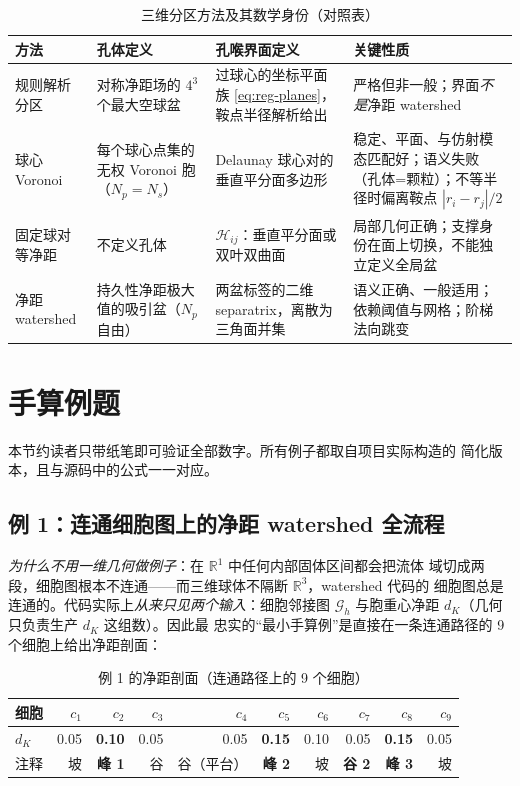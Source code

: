 \documentclass[UTF8,zihao=-4]{ctexart}
\newcommand{\R}{\mathbb{R}}
\begin{document}
\begin{table}[htbp]
\centering
\caption{三维分区方法及其数学身份（对照表）}
\label{tab:partition-identity}
\small
\begin{tabularx}{\textwidth}{p{2.9cm}p{3.2cm}p{3.6cm}X}
\toprule
方法 & 孔体定义 & 孔喉界面定义 & 关键性质\\
\midrule
规则解析分区
& 对称净距场的 $4^3$ 个最大空球盆
& 过球心的坐标平面族 \eqref{eq:reg-planes}，鞍点半径解析给出
& 严格但非一般；界面\emph{不是}净距 watershed\\
球心 Voronoi
& 每个球心点集的无权 Voronoi 胞（$N_p=N_s$）
& Delaunay 球心对的垂直平分面多边形
& 稳定、平面、与仿射模态匹配好；语义失败（孔体=颗粒）；不等半径时偏离鞍点 $|r_i-r_j|/2$\\
固定球对等净距
& 不定义孔体
& $\mathcal H_{ij}$：垂直平分面或双叶双曲面
& 局部几何正确；支撑身份在面上切换，不能独立定义全局盆\\
净距 watershed
& 持久性净距极大值的吸引盆（$N_p$ 自由）
& 两盆标签的二维 separatrix，离散为三角面并集
& 语义正确、一般适用；依赖阈值与网格；阶梯法向跳变\\
\bottomrule
\end{tabularx}
\end{table}

\section{手算例题}

本节约读者只带纸笔即可验证全部数字。所有例子都取自项目实际构造的
简化版本，且与源码中的公式一一对应。

\subsection{例 1：连通细胞图上的净距 watershed 全流程}

\emph{为什么不用一维几何做例子}：在 $\R^1$ 中任何内部固体区间都会把流体
域切成两段，细胞图根本不连通——而三维球体不隔断 $\R^3$，watershed 代码的
细胞图总是连通的。代码实际上\emph{从来只见两个输入}：细胞邻接图
$\mathcal G_h$ 与胞重心净距 $d_K$（几何只负责生产 $d_K$ 这组数）。因此最
忠实的``最小手算例''是直接在一条连通路径的 9 个细胞上给出净距剖面：

\begin{table}[htbp]
\centering
\caption{例 1 的净距剖面（连通路径上的 9 个细胞）}
\label{tab:ex1-profile}
\small
\begin{tabular}{lrrrrrrrrr}
\toprule
细胞 & $c_1$ & $c_2$ & $c_3$ & $c_4$ & $c_5$ & $c_6$ & $c_7$ & $c_8$ & $c_9$\\
\midrule
$d_K$ & 0.05 & \textbf{0.10} & 0.05 & 0.05 & \textbf{0.15} & 0.10 & 0.05 & \textbf{0.15} & 0.05\\
注释 & 坡 & \textbf{峰 1} & 谷 & 谷（平台） & \textbf{峰 2} & 坡 & \textbf{谷 2} & \textbf{峰 3} & 坡\\
\bottomrule
\end{tabular}
\end{table}
\end{document}
